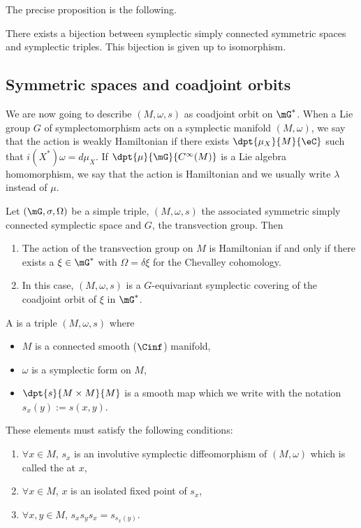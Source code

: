 The precise proposition is the following.

\begin{proposition}
There exists a bijection between symplectic simply connected symmetric spaces and symplectic triples. This bijection is given up to isomorphism.
\end{proposition}

\subsection{Symmetric spaces and coadjoint orbits}

We are now going to describe $(M,\omega,s)$ as coadjoint orbit on $\mG^*$. When a Lie group $G$ of symplectomorphism acts on a symplectic manifold $(M,\omega)$, we say that the action is weakly Hamiltonian if there exists $\dpt{\mu_X}{M}{\eC}$ such that $i(X^*)\omega=d\mu_X$. If $\dpt{\mu}{\mG}{ C^{\infty}(M)}$ is a Lie algebra homomorphism, we say that the action is Hamiltonian and we usually write $\lambda$ instead of $\mu$.

\begin{proposition}
Let $(\mG,\sigma,\Omega)$ be a simple triple, $(M,\omega,s)$ the associated symmetric simply connected symplectic space and $G$, the transvection group. Then

\begin{enumerate}
\item The action of the transvection group on $M$ is Hamiltonian if and only if there exists a $\xi\in\mG^*$ with $\Omega=\delta\xi$ for the Chevalley cohomology.
\item In this case, $(M,\omega,s)$ is a $G$-equivariant symplectic covering of the coadjoint orbit of $\xi$ in $\mG^*$.
\end{enumerate}

\end{proposition}

\begin{definition}
A  is a triple $(M,\omega,s)$ where
\begin{itemize}
\item $M$ is a connected smooth ($\Cinf$) manifold,
\item $\omega$ is a symplectic form on $M$,
\item $\dpt{s}{M\times M}{M}$ is a smooth map which we write with the notation $s_x(y):=s(x,y)$.
\end{itemize}
These elements must satisfy the following conditions:
 \begin{enumerate}
 \item $\forall x\in M$, $s_x$ is an involutive symplectic diffeomorphism of $(M,\omega)$ which is called the  at $x$,
 \item $\forall x\in M$, $x$ is an isolated fixed point of $s_x$,
 \item $\forall x,y\in M$, $s_xs_ys_x=s_{s_x(y)}$.
\end{enumerate}

\end{definition}


